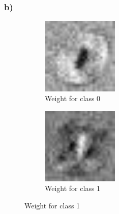 \subsubsection*{b)}

\begin{figure}
    \begin{subfigure}
        \centering
        \includegraphics[width=0.4\textwidth]{figures/weights/class_0_weight_image.jpg}
        \caption{Weight for class 0}
        \label{fig:class_0_weight}
    \end{subfigure}
    \begin{subfigure}
        \centering
        \includegraphics[width=0.4\textwidth]{figures/weights/class_1_weight_image.jpg}
        \caption{Weight for class 1}
        \label{fig:class_1_weight}
    \end{subfigure}

    \newpage


\end{figure}
